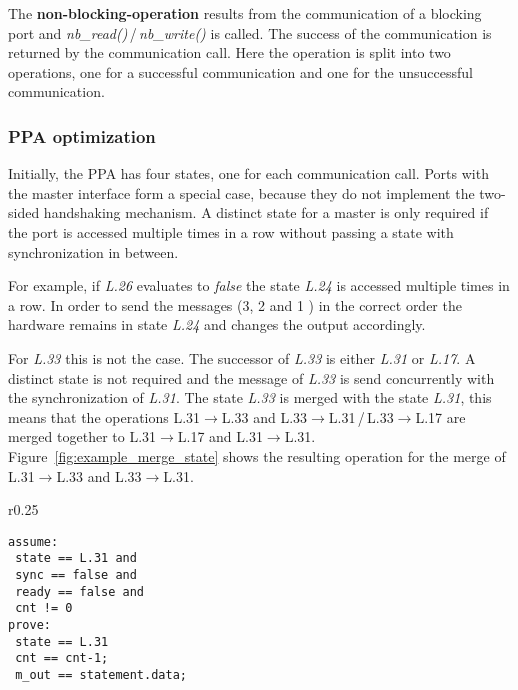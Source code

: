 The \textbf{non-blocking-operation} results from the communication of a blocking port and \textit{nb\_read()}\,/\,\textit{nb\_write()} is called. 
The success of the communication is returned by the communication call. 
Here the operation is split into two operations, one for a successful communication and one for the unsuccessful communication.  

\subsubsection{PPA optimization}

Initially, the PPA has four states, one for each communication call. 
Ports with the master interface form a special case, because they do not implement the two-sided handshaking mechanism. 
A distinct state for a master is only required if the port is accessed multiple times in a row without passing a state with synchronization in between. 

For example, if \textit{L.26} evaluates to \textit{false} the state \textit{L.24} is accessed multiple times in a row. 
In order to send the messages (3, 2 and 1 ) in the correct order the hardware remains in state \textit{L.24} and changes the output accordingly. 

For \textit{L.33} this is not the case. 
The successor of \textit{L.33} is either \textit{L.31} or \textit{L.17}. 
A distinct state is not required and the message of \textit{L.33} is send concurrently with the synchronization of \textit{L.31}. 
The state \textit{L.33} is merged with the state \textit{L.31}, this means that the operations L.31$\rightarrow$L.33 and L.33$\rightarrow$L.31\,/\,L.33$\rightarrow$L.17 are merged together to L.31$\rightarrow$L.17 and L.31$\rightarrow$L.31. 
Figure~\ref{fig:example_merge_state} shows the resulting operation for the merge of  L.31$\rightarrow$L.33 and L.33$\rightarrow$L.31.  

\begin{wrapfigure}{r}{0.25\textwidth}
		\centering
			\vspace{-20pt}
		\caption{Merged operation}
		\label{fig:example_merge_state}
		\begin{small}
		\begin{lstlisting}
assume:
 state == L.31 and
 sync == false and 	
 ready == false and
 cnt != 0 
prove: 
 state == L.31
 cnt == cnt-1;
 m_out == statement.data;
\end{lstlisting}
\end{small}
\end{wrapfigure}
 
